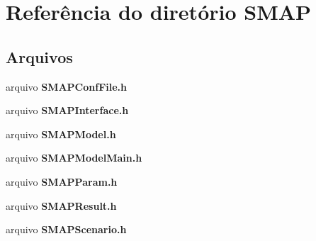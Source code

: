 \section{Referência do diretório S\+M\+AP}
\label{dir_93b0b88dc1773087d480bc14e7515b4e}
\subsection*{Arquivos}
\begin{DoxyCompactItemize}
\item 
arquivo {\bf S\+M\+A\+P\+Conf\+File.\+h}
\item 
arquivo {\bf S\+M\+A\+P\+Interface.\+h}
\item 
arquivo {\bf S\+M\+A\+P\+Model.\+h}
\item 
arquivo {\bf S\+M\+A\+P\+Model\+Main.\+h}
\item 
arquivo {\bf S\+M\+A\+P\+Param.\+h}
\item 
arquivo {\bf S\+M\+A\+P\+Result.\+h}
\item 
arquivo {\bf S\+M\+A\+P\+Scenario.\+h}
\end{DoxyCompactItemize}
